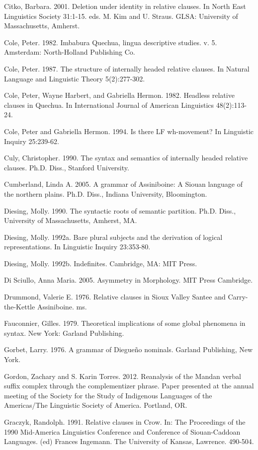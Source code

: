 \documentclass[output=paper]{LSP/langsci}
\begin{document}
\begin{reflist}
Citko, Barbara. 2001. Deletion under identity in relative clauses. In North East Linguistics Society 31:1-15. eds. M. Kim and U. Straus. GLSA: University of Massachusetts, Amherst.

Cole, Peter. 1982. Imbabura Quechua, lingua descriptive studies. v. 5. Amsterdam: North-Holland Publishing Co.

Cole, Peter. 1987. The structure of internally headed relative clauses. In Natural Language and Linguistic Theory 5(2):277-302. 

Cole, Peter, Wayne Harbert, and Gabriella Hermon. 1982. Headless relative clauses in Quechua. In International Journal of American Linguistics 48(2):113-24.

Cole, Peter and Gabriella Hermon. 1994. Is there LF wh-movement? In Linguistic Inquiry 25:239-62.

Culy, Christopher. 1990. The syntax and semantics of internally headed relative clauses.  Ph.D. Diss., Stanford University.

Cumberland, Linda A. 2005. A grammar of Assiniboine: A Siouan language of the northern plains.  Ph.D. Diss., Indiana University, Bloomington.

Diesing, Molly. 1990. The syntactic roots of semantic partition. Ph.D. Diss., University of Massachusetts, Amherst, MA.

Diesing, Molly. 1992a. Bare plural subjects and the derivation of logical representations. In Linguistic Inquiry 23:353-80.

Diesing, Molly. 1992b. Indefinites. Cambridge, MA: MIT Press.

Di Sciullo, Anna Maria. 2005. Asymmetry in Morphology. MIT Press Cambridge.

Drummond, Valerie E. 1976. Relative clauses in Sioux Valley Santee and Carry-the-Kettle Assiniboine. ms.

Fauconnier, Gilles. 1979. Theoretical implications of some global phenomena in syntax. New York: Garland Publishing.

Gorbet, Larry. 1976. A grammar of Diegue\~no nominals. Garland Publishing, New York.

Gordon, Zachary and S. Karin Torres. 2012. Reanalysis of the Mandan verbal suffix complex through the complementizer phrase. Paper presented at the annual meeting of the Society for the Study of Indigenous Languages of the Americas/The Linguistic Society of America. Portland, OR.

Graczyk, Randolph. 1991. Relative clauses in Crow. In: The Proceedings of the 1990 Mid-America Linguistics Conference and Conference of Siouan-Caddoan Languages. (ed) Frances Ingemann. The University of Kansas, Lawrence. 490-504. 


\end{reflist}
\end{document}
